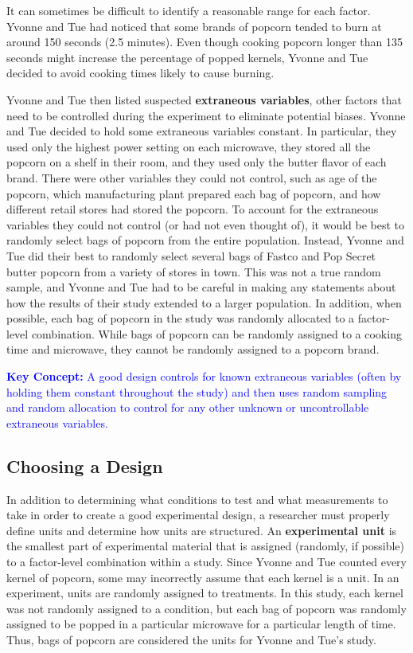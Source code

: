 \documentclass[
]{report}
\begin{document}
It can sometimes be difficult to identify a reasonable range for each factor. Yvonne and Tue had noticed that some brands of popcorn tended to burn at around 150 seconds (2.5 minutes). Even though cooking popcorn longer than 135 seconds might increase the percentage of popped kernels, Yvonne and Tue decided to avoid cooking times likely to cause burning.

Yvonne and Tue then listed suspected \textbf{extraneous variables}, other factors that need to be controlled during the experiment to eliminate potential biases. Yvonne and Tue decided to hold some extraneous variables constant. In particular, they used only the highest power setting on each microwave, they stored all the popcorn on a shelf in their room, and they used only the butter flavor of each brand. There were other variables they could not control, such as age of the popcorn, which manufacturing plant prepared each bag of popcorn, and how different retail stores had stored the popcorn. To account for the extraneous variables they could not control (or had not even thought of), it would be best to randomly select bags of popcorn from the entire population. Instead, Yvonne and Tue did their best to randomly select several bags of Fastco and Pop Secret butter popcorn from a variety of stores in town. This was not a true random sample, and Yvonne and Tue had to be careful in making any statements about how the results of their study extended to a larger population. In addition, when possible, each bag of popcorn in the study was randomly allocated to a factor-level combination. While bags of popcorn can be randomly assigned to a cooking time and microwave, they cannot be randomly assigned to a popcorn brand.

\textbf{\textcolor{blue}{Key Concept:}} \textcolor{blue}{A good design controls for known extraneous variables (often by holding them constant throughout the study) and then uses random sampling and random allocation to control for any other unknown or uncontrollable extraneous variables.}

\hypertarget{choosing-a-design}{%
\subsection*{Choosing a Design}\label{choosing-a-design}}

In addition to determining what conditions to test and what measurements to take in order to create a good experimental design, a researcher must properly define units and determine how units are structured. An \textbf{experimental unit} is the smallest part of experimental material that is assigned (randomly, if possible) to a factor-level combination within a study. Since Yvonne and Tue counted every kernel of popcorn, some may incorrectly assume that each kernel is a unit. In an experiment, units are randomly assigned to treatments. In this study, each kernel was not randomly assigned to a condition, but each bag of popcorn was randomly assigned to be popped in a particular microwave for a particular length of time. Thus, bags of popcorn are considered the units for Yvonne and Tue's study.
\end{document}
